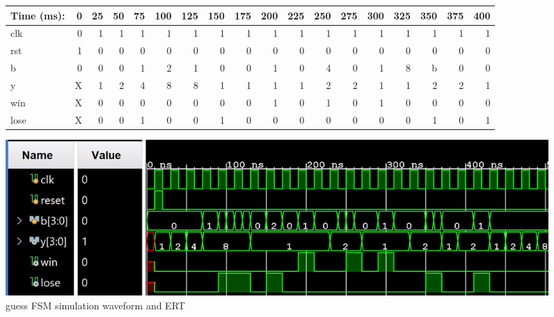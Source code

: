 \documentclass[11pt]{article}
\begin{document}
\begin{figure}[ht]\centering
	\begin{tabular}{l|rrrrrrrrrrrrrrrrr}
		Time (ms): & 0 & 25 & 50 & 75 & 100  & 125 & 150 & 175 & 200 & 225 & 250 & 275 & 300 & 325 & 350  & 375 & 400  \\
		\midrule
		clk & 0 & 1 & 1 & 1 & 1 & 1 & 1 & 1 & 1 & 1 & 1 & 1 & 1 & 1 & 1 & 1 & 1\\
		rst & 1 & 0 & 0 & 0 & 0 & 0 & 0 & 0 & 0 & 0 & 0 & 0 & 0 & 0 & 0 & 0 & 0 \\
		b & 0 & 0 & 0 & 1 & 2 & 1 & 0 & 0 & 1 & 0 & 4 & 0 & 1 & 8 & b & 0 & 0 \\
		\midrule
		y & X & 1 & 2 & 4 & 8 & 8 & 1 & 1 & 1 & 1 & 2 & 2 & 1 & 1 & 2 & 2 & 1 \\
		win & X & 0 & 0 & 0 & 0 & 0 & 0 & 0 & 1 & 0 & 1 & 0 & 1 & 0 & 0 & 0 & 0 \\
		lose & X & 0 & 0 & 1 & 0 & 0 & 1 & 0 & 0 & 0 & 0 & 0 & 0 & 0 & 1 & 0 & 1\\
		\bottomrule
	\end{tabular}\medskip

	
	\includegraphics[trim= 0cm 0cm 8cm 0cm]{guess_FSM_test.JPG}

	\caption{guess FSM simulation waveform and ERT}
	\label{fig:sim_with_table}
\end{figure}
\end{document}
